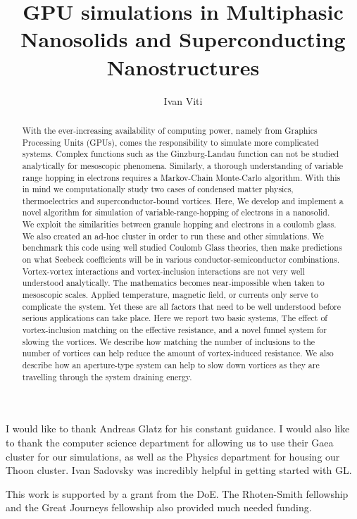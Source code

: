 \documentclass[12pt]{niuthesis}
\begin{document}
\title{GPU simulations in Multiphasic Nanosolids and Superconducting Nanostructures}

\author{Ivan Viti}


\begin{abstract}
	With the ever-increasing availability of computing power, namely from Graphics Processing Units (GPUs), comes the responsibility to simulate more complicated systems. Complex functions such as the Ginzburg-Landau function can not be studied analytically for mesoscopic phenomena. Similarly, a thorough understanding of variable range hopping in electrons requires a Markov-Chain Monte-Carlo algorithm. With this in mind we computationally study two cases of condensed matter physics, thermoelectrics and superconductor-bound vortices.
	Here, We develop and implement a novel algorithm for simulation of variable-range-hopping of electrons in a nanosolid. We exploit the similarities between granule hopping and electrons in a coulomb glass.  We also created an ad-hoc cluster in order to run these and other simulations. We benchmark this code using well studied Coulomb Glass  theories, then make predictions on what Seebeck coefficients will be in various conductor-semiconductor combinations.
	Vortex-vortex interactions and vortex-inclusion interactions are not very well understood analytically. The mathematics becomes near-impossible when taken to mesoscopic scales. Applied temperature, magnetic field, or currents only serve to complicate the system. Yet these are all factors that need to be well understood before serious applications can take place. Here we report two basic systems, The effect of vortex-inclusion matching on the effective resistance, and a novel funnel system for slowing the vortices. We describe how matching the number of inclusions to the number of vortices can help reduce the amount of vortex-induced resistance. We also describe how an aperture-type system can help to slow down vortices as they are travelling through the system draining energy. 



\end{abstract}

\begin{acknowledgments}
  I would like to thank Andreas Glatz for his constant guidance. I would also like to thank the computer science department for allowing us to use their Gaea cluster for our simulations, as well as the Physics department for housing our Thoon cluster. Ivan Sadovsky was incredibly helpful in getting started with GL.
  
  This work is supported by a grant from the DoE. The Rhoten-Smith fellowship and the Great Journeys fellowship also provided much needed funding. 
\end{acknowledgments}
\end{document}
